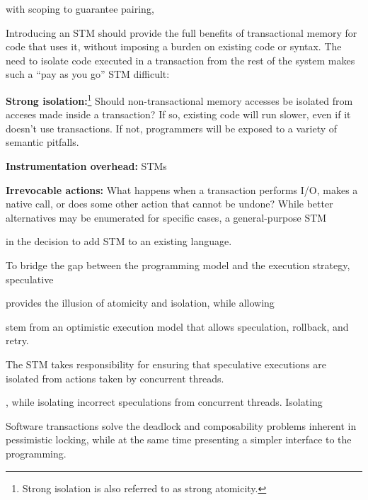with scoping to
guarantee pairing, 

Introducing
an STM should provide the full benefits of transactional memory for
code that uses it, without imposing a burden on existing code or syntax.
The need to isolate code executed in a transaction from the rest of the system
makes such a ``pay as you go'' STM difficult:
\begin{packed_itemize}

\item \textbf{Strong isolation:}\footnote{Strong isolation is also 
referred to as strong atomicity.} Should non-transactional memory accesses be isolated from
acceses made inside a transaction?  If so, existing code will run slower, even
if it doesn't use transactions.  If not, programmers will be exposed to a
variety of semantic pitfalls.

\item \textbf{Instrumentation overhead:} STMs 

\item \textbf{Irrevocable actions:} What happens when a transaction performs
I/O, makes a native call, or does some other action that cannot be undone?
While better alternatives may be enumerated for specific cases, a
general-purpose STM 

\item 

\end{packed_itemize}

in the decision to add STM to an existing language.


To bridge the gap between the programming model and the execution
strategy, speculative 

provides the illusion of
atomicity and isolation, while allowing 


stem from an optimistic execution model that allows speculation, rollback,
and retry.  

The STM takes responsibility for ensuring that speculative
executions are isolated from actions taken by concurrent threads.

, while isolating incorrect speculations from concurrent threads.
Isolating 

Software transactions
solve the deadlock and composability problems inherent in pessimistic
locking, while at the same time presenting a simpler interface to the
programming.
